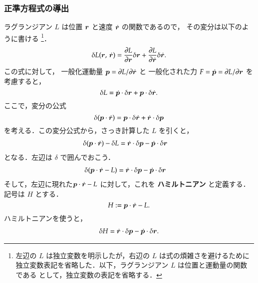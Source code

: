             \subsubsection{正準方程式の導出}
                ラグランジアン $L$ は位置 $\boldsymbol{r}$ と速度 $\dot{\boldsymbol{r}}$ の関数であるので，
                その変分は以下のように書ける
                    \footnote{
                        左辺の $L$ は独立変数を明示したが，右辺の $L$ は式の煩雑さを避けるために
                        独立変数表記を省略した．以下，ラグランジアン $L$ は位置と運動量の関数である
                        として，独立変数の表記を省略する．
                    }．
                    \begin{equation*}
                        \delta L(\boldsymbol{r},\,\dot{\boldsymbol{r}}) =   \frac{\partial L}{\partial \boldsymbol{r}}\delta \boldsymbol{r}
                                                    + \frac{\partial L}{\partial \dot{\boldsymbol{r}}}\delta \dot{\boldsymbol{r}}.
                    \end{equation*}
                この式に対して，
                一般化運動量 $\boldsymbol{p} = \partial L/\partial \dot{\boldsymbol{r}}$ と
                一般化された力 $F=\dot{\boldsymbol{p}} = \partial L/\partial \boldsymbol{r}$ を考慮すると，
                    \begin{equation*}
                       \delta  L =  \dot{\boldsymbol{p}} \cdot \delta \boldsymbol{r} + \boldsymbol{p} \cdot \delta \dot{\boldsymbol{r}}.
                    \end{equation*}
                ここで，変分の公式
                    \begin{equation*}
                        \delta(\boldsymbol{p}\cdot\dot{\boldsymbol{r}}) = \boldsymbol{p}\cdot\delta\dot{\boldsymbol{r}} + \dot{\boldsymbol{r}}\cdot\delta\boldsymbol{p}
                    \end{equation*}
                を考える．この変分公式から，さっき計算した $L$ を引くと，
                    \begin{align*}
                        \delta(\boldsymbol{p}\cdot\dot{\boldsymbol{r}}) - \delta L &= \dot{\boldsymbol{r}}\cdot \delta\boldsymbol{p} - \dot{\boldsymbol{p}} \cdot \delta \boldsymbol{r}
                    \end{align*}
                となる．左辺は $\delta$ で囲んでおこう．
                    \begin{align*}
                        \delta(\boldsymbol{p}\cdot\dot{\boldsymbol{r}} - L) &= \dot{\boldsymbol{r}}\cdot \delta\boldsymbol{p} - \dot{\boldsymbol{p}} \cdot \delta \boldsymbol{r}
                    \end{align*}
                そして，左辺に現れた$\boldsymbol{p} \cdot \dot{\boldsymbol{r}} - L$ に対して，これを \textbf{ハミルトニアン} と定義する．
                記号は $H$ とする．
                    \begin{equation*}
                        H := \boldsymbol{p} \cdot \dot{\boldsymbol{r}} - L.
                    \end{equation*}
                ハミルトニアンを使うと，
                    \begin{align}\label{eq:HamiltonianBrp}
                        \delta H = \dot{\br}\cdot\delta\bp - \dot{\bp} \cdot\delta \br.
                    \end{align}

